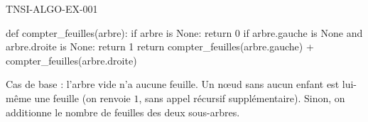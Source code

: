 \begin{corrige}{TNSI-ALGO-EX-001}
\begin{python}
def compter_feuilles(arbre):
    if arbre is None:
        return 0
    if arbre.gauche is None and arbre.droite is None:
        return 1
    return compter_feuilles(arbre.gauche) + compter_feuilles(arbre.droite)
\end{python}
Cas de base : l'arbre vide n'a aucune feuille. Un nœud sans aucun enfant est lui-même une feuille (on renvoie $1$, sans appel récursif supplémentaire). Sinon, on additionne le nombre de feuilles des deux sous-arbres.
\end{corrige}
